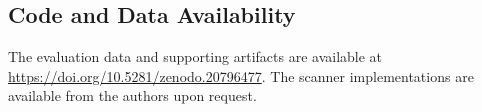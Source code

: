 



\subsection{Code and Data Availability}
The evaluation data and supporting artifacts are
available at
\url{https://doi.org/10.5281/zenodo.20796477}.
The scanner implementations are available from
the authors upon request.